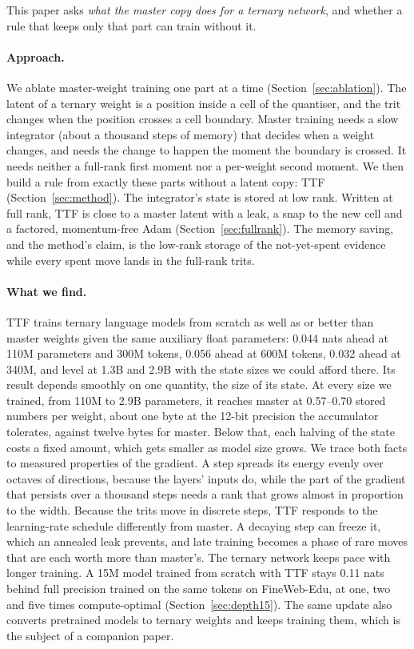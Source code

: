 \documentclass[10pt,twocolumn]{article}
\begin{document}
This paper asks \emph{what the master copy does for a ternary network}, and whether a rule that keeps only that part
can train without it.

\paragraph{Approach.} We ablate master-weight training one part at a time (Section~\ref{sec:ablation}). The latent
of a ternary weight is a position inside a cell of the quantiser, and the trit changes when the position crosses a cell
boundary. Master training needs a slow integrator (about a thousand steps of memory) that decides when a weight changes,
and needs the change to happen the moment the boundary is crossed. It needs neither a full-rank first moment nor a
per-weight second moment. We then build a rule from exactly these parts without a latent copy: TTF
(Section~\ref{sec:method}). The integrator's state is stored at low rank. Written at full rank, TTF is close to a master
latent with a leak, a snap to the new cell and a factored, momentum-free Adam (Section~\ref{sec:fullrank}). The memory saving,
and the method's claim, is the low-rank storage of the not-yet-spent evidence while every spent move lands in the
full-rank trits.

\paragraph{What we find.} TTF trains ternary language models from scratch as well as or better than master weights
given the same auxiliary float parameters: 0.044 nats ahead at 110M parameters and 300M tokens, 0.056 ahead at 600M
tokens, 0.032 ahead at 340M, and level at 1.3B and 2.9B with the state sizes we could afford there. Its result depends
smoothly on one quantity, the size of its state. At every size we trained, from 110M to 2.9B parameters, it reaches master
at 0.57--0.70 stored numbers per weight, about one byte at the 12-bit precision the accumulator tolerates, against twelve
bytes for master. Below that, each halving of the state costs a fixed amount, which gets smaller as model size grows. We trace both
facts to measured properties of the gradient. A step spreads its energy evenly over octaves of directions, because the
layers' inputs do, while the part of the gradient that persists over a thousand steps needs a rank that grows almost in
proportion to the width. Because the trits move in discrete steps, TTF responds to the learning-rate schedule
differently from master. A decaying step can freeze it, which an annealed leak prevents, and late training becomes a
phase of rare moves that are each worth more than master's. The ternary network keeps pace with longer training. A
15M model trained from scratch with TTF stays 0.11 nats behind full precision trained on the same tokens on FineWeb-Edu, at one, two
and five times compute-optimal (Section~\ref{sec:depth15}). The same update also converts pretrained models to ternary
weights and keeps training them, which is the subject of a companion paper.
\end{document}
